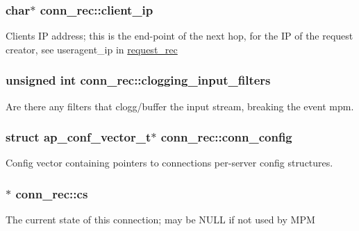 \subsubsection[{\texorpdfstring{client\+\_\+ip}{client_ip}}]{\setlength{\rightskip}{0pt plus 5cm}char$\ast$ conn\+\_\+rec\+::client\+\_\+ip}\hypertarget{structconn__rec_a792faf741c8f0f87587089e194360fba}{}\label{structconn__rec_a792faf741c8f0f87587089e194360fba}
Client\textquotesingle{}s IP address; this is the end-\/point of the next hop, for the IP of the request creator, see useragent\+\_\+ip in \hyperlink{structrequest__rec}{request\+\_\+rec} 
\subsubsection[{\texorpdfstring{clogging\+\_\+input\+\_\+filters}{clogging_input_filters}}]{\setlength{\rightskip}{0pt plus 5cm}unsigned {\bf int} conn\+\_\+rec\+::clogging\+\_\+input\+\_\+filters}\hypertarget{structconn__rec_a005d7cb5ec440aa54aeb06330936c2af}{}\label{structconn__rec_a005d7cb5ec440aa54aeb06330936c2af}
Are there any filters that clogg/buffer the input stream, breaking the event mpm. 
\subsubsection[{\texorpdfstring{conn\+\_\+config}{conn_config}}]{\setlength{\rightskip}{0pt plus 5cm}struct {\bf ap\+\_\+conf\+\_\+vector\+\_\+t}$\ast$ conn\+\_\+rec\+::conn\+\_\+config}\hypertarget{structconn__rec_ad7095a63f14895cb234525086dd48e0c}{}\label{structconn__rec_ad7095a63f14895cb234525086dd48e0c}
Config vector containing pointers to connections per-\/server config structures. 
\subsubsection[{\texorpdfstring{cs}{cs}}]{$\ast$ conn\+\_\+rec\+::cs}\hypertarget{structconn__rec_a1cfa5dbd0193d91302d8ae0953bcbda1}{}\label{structconn__rec_a1cfa5dbd0193d91302d8ae0953bcbda1}
The current state of this connection; may be N\+U\+LL if not used by M\+PM 
